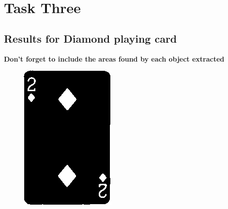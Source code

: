 \documentclass[conference]{IEEEtran}
\begin{document}
\section{Task Three} \label{three}
\subsection{Results for Diamond playing card}

\textbf{Don't forget to include the areas found by each object extracted}

\begin{figure}[!htb]
  \centering
  \begin{minipage}[b]{0.2\textwidth}
    \includegraphics[width=\textwidth]{../programme/results/Task_3/diamond/image_0.jpg}

\end{minipage}
\end{figure}
\end{document}
